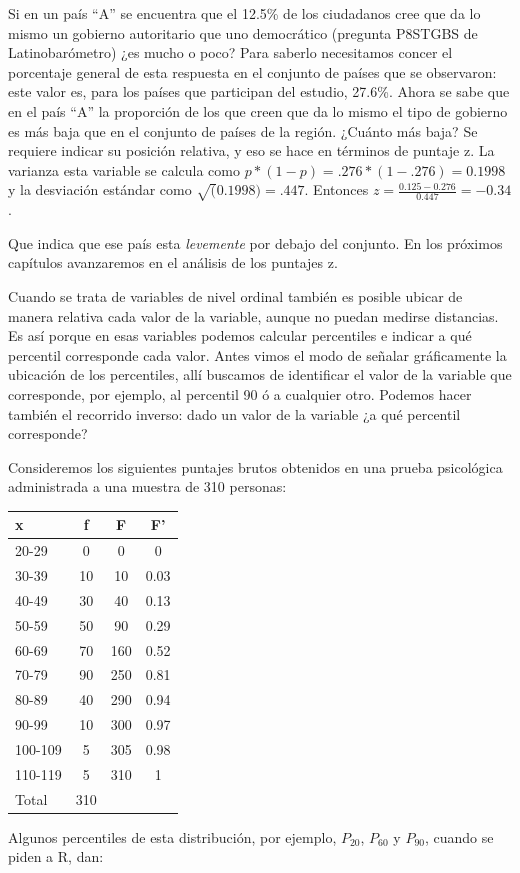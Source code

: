 \documentclass[]{book}
\begin{document}
Si en un país ``A'' se encuentra que el 12.5\% de los ciudadanos cree que da lo mismo un gobierno autoritario que uno democrático (pregunta P8STGBS de Latinobarómetro) ¿es mucho o poco? Para saberlo necesitamos concer el porcentaje general de esta respuesta en el conjunto de países que se observaron: este valor es, para los países que participan del estudio, 27.6\%. Ahora se sabe que en el país ``A'' la proporción de los que creen que da lo mismo el tipo de gobierno es más baja que en el conjunto de países de la región. ¿Cuánto más baja? Se requiere indicar su posición relativa, y eso se hace en términos de puntaje z. La varianza esta variable se calcula como \(p*(1-p)=.276*(1-.276)=0.1998\) y la desviación estándar como \(\sqrt(0.1998)=.447\). Entonces \(z = \frac{0.125-0.276}{0.447}=-0.34\).

Que indica que ese país esta \emph{levemente} por debajo del conjunto. En los próximos capítulos avanzaremos en el análisis de los puntajes z.

Cuando se trata de variables de nivel ordinal también es posible ubicar de manera relativa cada valor de la variable, aunque no puedan medirse distancias. Es así porque en esas variables podemos calcular percentiles e indicar a qué percentil corresponde cada valor. Antes vimos el modo de señalar gráficamente la ubicación de los percentiles, allí buscamos de identificar el valor de la variable que corresponde, por ejemplo, al percentil 90 ó a cualquier otro. Podemos hacer también el recorrido inverso: dado un valor de la variable ¿a qué percentil corresponde?

Consideremos los siguientes puntajes brutos obtenidos en una prueba
psicológica administrada a una muestra de 310 personas:

\begin{longtable}[]{@{}lccc@{}}
\toprule
x & f & F & F'\tabularnewline
\midrule
\endhead
20-29 & 0 & 0 & 0\tabularnewline
30-39 & 10 & 10 & 0.03\tabularnewline
40-49 & 30 & 40 & 0.13\tabularnewline
50-59 & 50 & 90 & 0.29\tabularnewline
60-69 & 70 & 160 & 0.52\tabularnewline
70-79 & 90 & 250 & 0.81\tabularnewline
80-89 & 40 & 290 & 0.94\tabularnewline
90-99 & 10 & 300 & 0.97\tabularnewline
100-109 & 5 & 305 & 0.98\tabularnewline
110-119 & 5 & 310 & 1\tabularnewline
Total & 310 & &\tabularnewline
\bottomrule
\end{longtable}

Algunos percentiles de esta distribución, por ejemplo, \(P_{20}\), \(P_{60}\) y \(P_{90}\), cuando se piden a R, dan:
\end{document}
